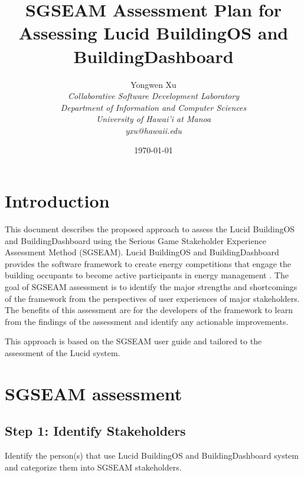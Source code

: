 \documentclass[11pt]{article}
\begin{document}
\title{SGSEAM Assessment Plan for Assessing Lucid BuildingOS and BuildingDashboard}

\author{
	 Yongwen Xu \\
\em  Collaborative Software Development Laboratory \\
\em  Department of Information and Computer Sciences \\
\em  University of Hawai'i at Manoa\\
     yxu@hawaii.edu \\
}

\date{\today}
\maketitle

\tableofcontents

\graphicspath{{figures/}} 

\section{Introduction}
This document describes the proposed approach to assess the Lucid BuildingOS and BuildingDashboard using the Serious Game Stakeholder Experience Assessment Method (SGSEAM). Lucid BuildingOS and BuildingDashboard provides the software framework to create energy competitions that engage the building occupants to become active participants in energy management \cite{building-dashboard}. The goal of SGSEAM assessment is to identify the major strengths and shortcomings of the framework from the perspectives of user experiences of major stakeholders. The benefits of this assessment are for the developers of the framework to learn from the findings of the assessment and identify any actionable improvements.

This approach is based on the SGSEAM user guide \cite{csdl2-13-06} and tailored to the assessment of the Lucid system.

\section{SGSEAM assessment}

\subsection{Step 1: Identify Stakeholders}
Identify the person(s) that use Lucid BuildingOS and BuildingDashboard system and categorize them into SGSEAM stakeholders.
\end{document}
